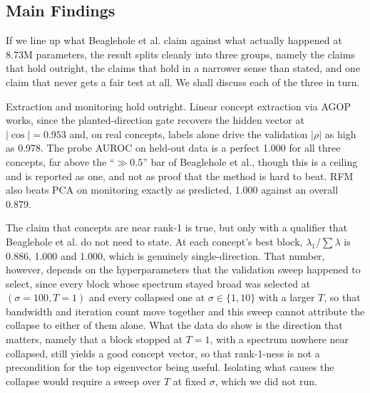 \subsection{Main Findings}

If we line up what Beaglehole et al. claim against what actually happened at 8.73M
parameters, the result splits cleanly into three groups, namely the claims that hold
outright, the claims that hold in a narrower sense than stated, and one claim that never
gets a fair test at all. We shall discuss each of the three in turn.

Extraction and monitoring hold outright. Linear concept extraction via AGOP works, since
the planted-direction gate recovers the hidden vector at $|\cos| = 0.953$ and, on real
concepts, labels alone drive the validation $|\rho|$ as high as 0.978. The probe AUROC on
held-out data is a perfect 1.000 for all three concepts, far above the ``$\gg 0.5$'' bar
of Beaglehole et al., though this is a ceiling and is reported as one, and not as proof
that the method is hard to beat. RFM also beats PCA on monitoring exactly as predicted,
1.000 against an overall 0.879.

The claim that concepts are near rank-1 is true, but only with a qualifier that Beaglehole
et al. do not need to state. At each concept's best block, $\lambda_1/\sum\lambda$ is
0.886, 1.000 and 1.000, which is genuinely single-direction. That number, however, depends
on the hyperparameters that the validation sweep happened to select, since every block
whose spectrum stayed broad was selected at $(\sigma = 100, T = 1)$ and every collapsed
one at $\sigma \in \{1, 10\}$ with a larger $T$, so that bandwidth and iteration count move
together and this sweep cannot attribute the collapse to either of them alone. What the
data do show is the direction that matters, namely that a block stopped at $T = 1$, with a
spectrum nowhere near collapsed, still yields a good concept vector, so that rank-1-ness
is not a precondition for the top eigenvector being useful. Isolating what causes the
collapse would require a sweep over $T$ at fixed $\sigma$, which we did not run.


